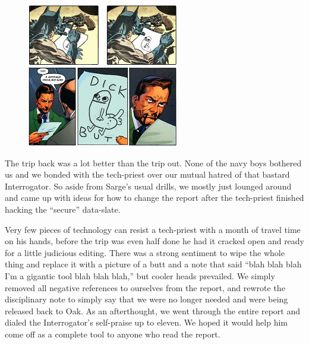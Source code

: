 \begin{figure}
\begin{center}
	\includegraphics[width=\figwidth]{pics/3/29.png}
\end{center}
\end{figure}
The trip back was a lot better than the trip out. None of the navy boys bothered us and we bonded with the tech-priest over our mutual hatred of that bastard Interrogator. So aside from Sarge’s usual drills, we mostly just lounged around and came up with ideas for how to change the report after the tech-priest finished hacking the “secure” data-slate.

Very few pieces of technology can resist a tech-priest with a month of travel time on his hands, before the trip was even half done he had it cracked open and ready for a little judicious editing. 
There was a strong sentiment to wipe the whole thing and replace it with a picture of a butt and a note that said “blah blah blah I’m a gigantic tool blah blah blah,” but cooler heads prevailed. 
We simply removed all negative references to ourselves from the report, and rewrote the disciplinary note to simply say that we were no longer needed and were being released back to Oak. 
As an afterthought, we went through the entire report and dialed the Interrogator’s self-praise up to eleven. 
We hoped it would help him come off as a complete tool to anyone who read the report.

